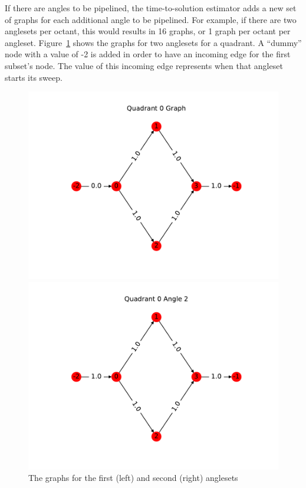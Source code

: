 \documentclass[times,final]{elsarticle}
\begin{document}
If there are angles to be pipelined, the time-to-solution estimator adds a new set of graphs for each additional angle to be pipelined. For example, if there are two anglesets per octant, this would results in 16 graphs, or 1 graph per octant per angleset. Figure~\ref{angular_pipeline} shows the graphs for two anglesets for a quadrant. A ``dummy'' node with a value of -2 is added in order to have an incoming edge for the first subset's node. The value of this incoming edge represents when that angleset starts its sweep.
\begin{figure}[H]
\begin{minipage}[c]{0.5\textwidth}
\centering
\includegraphics[scale=0.6]{../figures/q0_postpipeline.pdf}
\end{minipage}
\begin{minipage}[c]{0.5\textwidth}
\centering
\includegraphics[scale=0.6]{../figures/q4_postpipeline.pdf}
\end{minipage}
\caption{The graphs for the first (left) and second (right) anglesets}
\label{angular_pipeline}
\end{figure}
\end{document}
